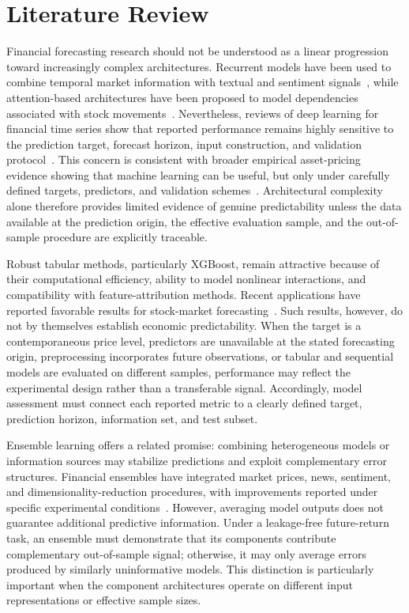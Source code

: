 \documentclass[utf8]{FrontiersinHarvard} %
\begin{document}
\section{Literature Review}
\label{sec:literature_review}

Financial forecasting research should not be understood as a linear progression toward increasingly complex architectures. Recurrent models have been used to combine temporal market information with textual and sentiment signals~\citep{Usmani2023,John2023}, while attention-based architectures have been proposed to model dependencies associated with stock movements~\citep{Zhang2022transformer}. Nevertheless, reviews of deep learning for financial time series show that reported performance remains highly sensitive to the prediction target, forecast horizon, input construction, and validation protocol~\citep{Zhang2024review}. This concern is consistent with broader empirical asset-pricing evidence showing that machine learning can be useful, but only under carefully defined targets, predictors, and validation schemes~\citep{Gu2020}. Architectural complexity alone therefore provides limited evidence of genuine predictability unless the data available at the prediction origin, the effective evaluation sample, and the out-of-sample procedure are explicitly traceable.

Robust tabular methods, particularly XGBoost, remain attractive because of their computational efficiency, ability to model nonlinear interactions, and compatibility with feature-attribution methods. Recent applications have reported favorable results for stock-market forecasting~\citep{Gao2025xgboost,Shen2025xgboost}. Such results, however, do not by themselves establish economic predictability. When the target is a contemporaneous price level, predictors are unavailable at the stated forecasting origin, preprocessing incorporates future observations, or tabular and sequential models are evaluated on different samples, performance may reflect the experimental design rather than a transferable signal. Accordingly, model assessment must connect each reported metric to a clearly defined target, prediction horizon, information set, and test subset.

Ensemble learning offers a related promise: combining heterogeneous models or information sources may stabilize predictions and exploit complementary error structures. Financial ensembles have integrated market prices, news, sentiment, and dimensionality-reduction procedures, with improvements reported under specific experimental conditions~\citep{Li2021ensemble,Deng2024}. However, averaging model outputs does not guarantee additional predictive information. Under a leakage-free future-return task, an ensemble must demonstrate that its components contribute complementary out-of-sample signal; otherwise, it may only average errors produced by similarly uninformative models. This distinction is particularly important when the component architectures operate on different input representations or effective sample sizes.
\end{document}
